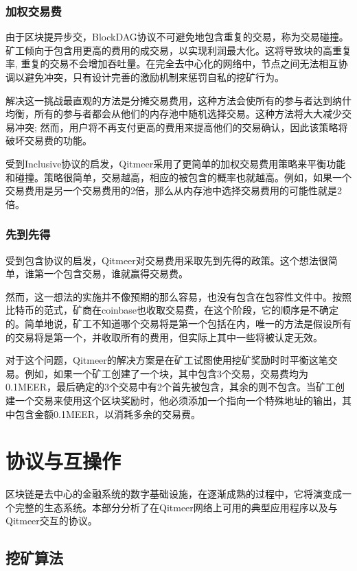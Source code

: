 \documentclass[a4paper,11pt]{article}
\begin{document}
\subsubsection{加权交易费}

由于区块提异步交，BlockDAG协议不可避免地包含重复的交易，称为交易碰撞。矿工倾向于包含用更高的费用的成交易，以实现利润最大化。这将导致块的高重复率, 重复的交易不会增加吞吐量。在完全去中心化的网络中，节点之间无法相互协调以避免冲突，只有设计完善的激励机制来惩罚自私的挖矿行为。

解决这一挑战最直观的方法是分摊交易费用，这种方法会使所有的参与者达到纳什均衡，所有的参与者都会从他们的内存池中随机选择交易。这种方法将大大减少交易冲突; 然而，用户将不再支付更高的费用来提高他们的交易确认，因此该策略将破坏交易费的功能。


受到Inclusive协议的启发，Qitmeer采用了更简单的加权交易费用策略来平衡功能和碰撞。策略很简单，交易越高，相应的被包含的概率也就越高。例如，如果一个交易费用是另一个交易费用的2倍，那么从内存池中选择交易费用的可能性就是2倍。

\subsubsection{先到先得}

受到包含协议的启发，Qitmeer对交易费用采取先到先得的政策。这个想法很简单，谁第一个包含交易，谁就赢得交易费。


然而，这一想法的实施并不像预期的那么容易，也没有包含在包容性文件中。按照比特币的范式，矿商在coinbase也收取交易费，在这个阶段，它的顺序是不确定的。简单地说，矿工不知道哪个交易将是第一个包括在内，唯一的方法是假设所有的交易将是第一个，并收取所有的费用，但实际上其中一些将被认定无效。


对于这个问题，Qitmeer的解决方案是在矿工试图使用挖矿奖励时时平衡这笔交易。例如，如果一个矿工创建了一个块，其中包含3个交易，交易费均为0.1MEER，最后确定的3个交易中有2个首先被包含，其余的则不包含。当矿工创建一个交易来使用这个区块奖励时，他必须添加一个指向一个特殊地址的输出，其中包含金额0.1MEER，以消耗多余的交易费。

\section{协议与互操作}
区块链是去中心的金融系统的数字基础设施，在逐渐成熟的过程中，它将演变成一个完整的生态系统。本部分分析了在Qitmeer网络上可用的典型应用程序以及与Qitmeer交互的协议。

\subsection{挖矿算法}
\end{document}
